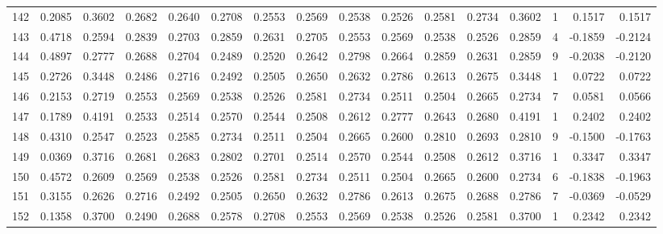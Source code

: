 \begin{tabular}{lrrrrrrrrrrrrrrr}
142 &      0.2085 &  0.3602 &  0.2682 &  0.2640 &  0.2708 &  0.2553 &  0.2569 &  0.2538 &  0.2526 &  0.2581 &   0.2734 &     0.3602 &      1 &                    0.1517 &                     0.1517 \\
143 &      0.4718 &  0.2594 &  0.2839 &  0.2703 &  0.2859 &  0.2631 &  0.2705 &  0.2553 &  0.2569 &  0.2538 &   0.2526 &     0.2859 &      4 &                   -0.1859 &                    -0.2124 \\
144 &      0.4897 &  0.2777 &  0.2688 &  0.2704 &  0.2489 &  0.2520 &  0.2642 &  0.2798 &  0.2664 &  0.2859 &   0.2631 &     0.2859 &      9 &                   -0.2038 &                    -0.2120 \\
145 &      0.2726 &  0.3448 &  0.2486 &  0.2716 &  0.2492 &  0.2505 &  0.2650 &  0.2632 &  0.2786 &  0.2613 &   0.2675 &     0.3448 &      1 &                    0.0722 &                     0.0722 \\
146 &      0.2153 &  0.2719 &  0.2553 &  0.2569 &  0.2538 &  0.2526 &  0.2581 &  0.2734 &  0.2511 &  0.2504 &   0.2665 &     0.2734 &      7 &                    0.0581 &                     0.0566 \\
147 &      0.1789 &  0.4191 &  0.2533 &  0.2514 &  0.2570 &  0.2544 &  0.2508 &  0.2612 &  0.2777 &  0.2643 &   0.2680 &     0.4191 &      1 &                    0.2402 &                     0.2402 \\
148 &      0.4310 &  0.2547 &  0.2523 &  0.2585 &  0.2734 &  0.2511 &  0.2504 &  0.2665 &  0.2600 &  0.2810 &   0.2693 &     0.2810 &      9 &                   -0.1500 &                    -0.1763 \\
149 &      0.0369 &  0.3716 &  0.2681 &  0.2683 &  0.2802 &  0.2701 &  0.2514 &  0.2570 &  0.2544 &  0.2508 &   0.2612 &     0.3716 &      1 &                    0.3347 &                     0.3347 \\
150 &      0.4572 &  0.2609 &  0.2569 &  0.2538 &  0.2526 &  0.2581 &  0.2734 &  0.2511 &  0.2504 &  0.2665 &   0.2600 &     0.2734 &      6 &                   -0.1838 &                    -0.1963 \\
151 &      0.3155 &  0.2626 &  0.2716 &  0.2492 &  0.2505 &  0.2650 &  0.2632 &  0.2786 &  0.2613 &  0.2675 &   0.2688 &     0.2786 &      7 &                   -0.0369 &                    -0.0529 \\
152 &      0.1358 &  0.3700 &  0.2490 &  0.2688 &  0.2578 &  0.2708 &  0.2553 &  0.2569 &  0.2538 &  0.2526 &   0.2581 &     0.3700 &      1 &                    0.2342 &                     0.2342 \\

\end{tabular}
